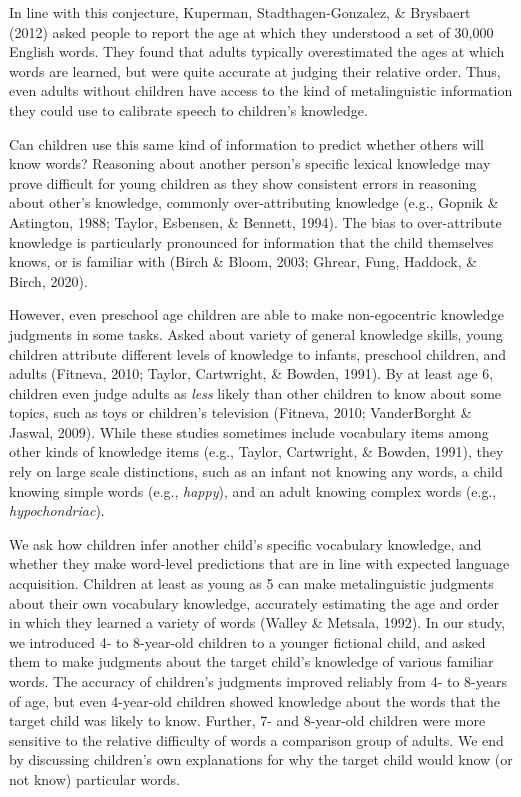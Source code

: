 \documentclass[10pt, letterpaper]{article}
\begin{document}
In line with this conjecture, Kuperman, Stadthagen-Gonzalez, \&
Brysbaert (2012) asked people to report the age at which they understood
a set of 30,000 English words. They found that adults typically
overestimated the ages at which words are learned, but were quite
accurate at judging their relative order. Thus, even adults without
children have access to the kind of metalinguistic information they
could use to calibrate speech to children's knowledge.

Can children use this same kind of information to predict whether others
will know words? Reasoning about another person's specific lexical
knowledge may prove difficult for young children as they show consistent
errors in reasoning about other's knowledge, commonly over-attributing
knowledge (e.g., Gopnik \& Astington, 1988; Taylor, Esbensen, \&
Bennett, 1994). The bias to over-attribute knowledge is particularly
pronounced for information that the child themselves knows, or is
familiar with (Birch \& Bloom, 2003; Ghrear, Fung, Haddock, \& Birch,
2020).

However, even preschool age children are able to make non-egocentric
knowledge judgments in some tasks. Asked about variety of general
knowledge skills, young children attribute different levels of knowledge
to infants, preschool children, and adults (Fitneva, 2010; Taylor,
Cartwright, \& Bowden, 1991). By at least age 6, children even judge
adults as \emph{less} likely than other children to know about some
topics, such as toys or children's television (Fitneva, 2010;
VanderBorght \& Jaswal, 2009). While these studies sometimes include
vocabulary items among other kinds of knowledge items (e.g., Taylor,
Cartwright, \& Bowden, 1991), they rely on large scale distinctions,
such as an infant not knowing any words, a child knowing simple words
(e.g., \emph{happy}), and an adult knowing complex words (e.g.,
\emph{hypochondriac}).

We ask how children infer another child's specific vocabulary knowledge,
and whether they make word-level predictions that are in line with
expected language acquisition. Children at least as young as 5 can make
metalinguistic judgments about their own vocabulary knowledge,
accurately estimating the age and order in which they learned a variety
of words (Walley \& Metsala, 1992). In our study, we introduced 4- to
8-year-old children to a younger fictional child, and asked them to make
judgments about the target child's knowledge of various familiar words.
The accuracy of children's judgments improved reliably from 4- to
8-years of age, but even 4-year-old children showed knowledge about the
words that the target child was likely to know. Further, 7- and
8-year-old children were more sensitive to the relative difficulty of
words a comparison group of adults. We end by discussing children's own
explanations for why the target child would know (or not know)
particular words.
\end{document}
